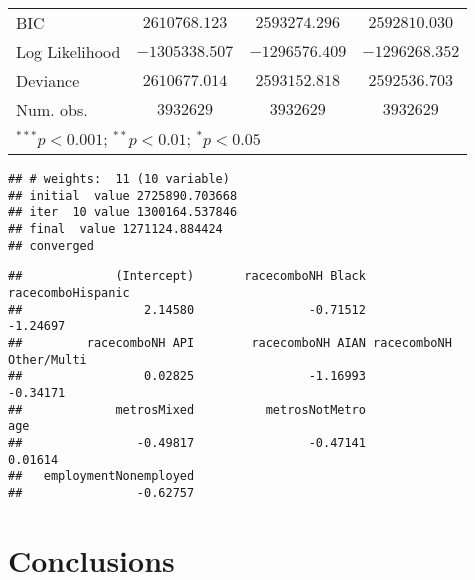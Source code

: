 \documentclass[11pt,]{article}
\begin{document}
\begin{table}
\begin{center}
\begin{tabular}{l c c c}
BIC                                    & $2610768.123$  & $2593274.296$  & $2592810.030$  \\
Log Likelihood                         & $-1305338.507$ & $-1296576.409$ & $-1296268.352$ \\
Deviance                               & $2610677.014$  & $2593152.818$  & $2592536.703$  \\
Num. obs.                              & $3932629$      & $3932629$      & $3932629$      \\
\hline
\multicolumn{4}{l}{\scriptsize{$^{***}p<0.001$; $^{**}p<0.01$; $^{*}p<0.05$}}
\end{tabular}
\label{table:coefficients}
\end{center}
\end{table}

\begin{verbatim}
## # weights:  11 (10 variable)
## initial  value 2725890.703668 
## iter  10 value 1300164.537846
## final  value 1271124.884424 
## converged
\end{verbatim}

\begin{verbatim}
##             (Intercept)       racecomboNH Black       racecomboHispanic 
##                 2.14580                -0.71512                -1.24697 
##         racecomboNH API        racecomboNH AIAN racecomboNH Other/Multi 
##                 0.02825                -1.16993                -0.34171 
##             metrosMixed          metrosNotMetro                     age 
##                -0.49817                -0.47141                 0.01614 
##   employmentNonemployed 
##                -0.62757
\end{verbatim}

\hypertarget{conclusions}{%
\section{Conclusions}\label{conclusions}}
\end{document}
